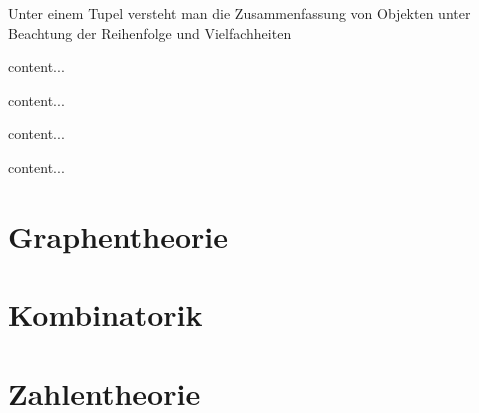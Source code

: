 \begin{definition}
	Unter einem Tupel versteht man die Zusammenfassung von Objekten unter Beachtung der Reihenfolge und Vielfachheiten
\end{definition}

\begin{definition}[Relationen]
	content...
\end{definition}

\begin{definition}[Funktionen]
	content...
\end{definition}

\begin{definition}[Kardinalitäten]
	content...
\end{definition}

\begin{definition}[Multimenge]
	content...
\end{definition}



\section{Graphentheorie}


\section{Kombinatorik}

\section{Zahlentheorie}

